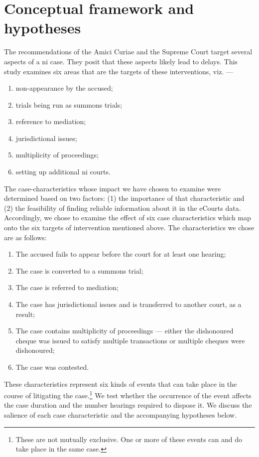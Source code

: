 \section{Conceptual framework and hypotheses}
\label{sec:select-case-char}

The recommendations of the Amici Curiae and the Supreme Court target several aspects of a \gls{ni} case. They posit that these aspects likely lead to delays. This study examines six areas that are the targets of these interventions, viz. ---

\begin{enumerate}
\item non-appearance by the accused;
\item trials being run as summons trials;
\item reference to mediation;
\item jurisdictional issues;
\item multiplicity of proceedings;
\item setting up additional \gls{ni} courts.
\end{enumerate}

The case-characteristics whose impact we have chosen to examine were determined based on two factors: (1) the importance of that characteristic and (2) the feasibility of finding reliable information about it in the eCourts data. Accordingly, we chose to examine the effect of six case characteristics which map onto the six targets of intervention mentioned above. The characteristics we chose are as follows:
\begin{enumerate}
\item The accused fails to appear before the court for at least one hearing;
\item The case is converted to a summons trial;
\item The case is referred to mediation;
\item The case has jurisdictional issues and is transferred to another court, as a result;
\item The case contains multiplicity of proceedings --- either the dishonoured cheque was issued to satisfy multiple transactions or multiple cheques were dishonoured;
\item The case was contested.
\end{enumerate}

These characteristics represent six kinds of events that can take place in the course of litigating the case.\footnote{These are not mutually exclusive. One or more of these events can and do take place in the same case.} We test whether the occurrence of the event affects the case duration and the number hearings required to dispose it. We discuss the salience of each case characteristic and the accompanying hypotheses below.

